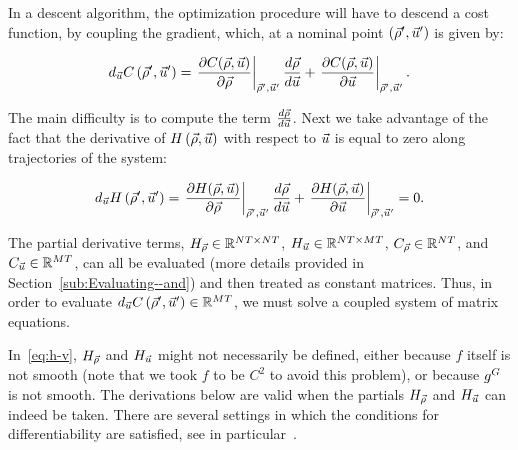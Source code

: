 In a descent algorithm, the optimization procedure will have to descend
a cost function, by coupling the gradient, which, at a nominal point
$\left(\vec{\rho}',\vec{u}'\right)$ is given by:

\begin{equation}
	d_{\vec{u}}C\left(\vec{\rho}',\vec{u}'\right)=\left.\frac{\partial C\text{\ensuremath{\left(\vec{\rho},\vec{u}\right)}}}{\partial\vec{\rho}}\right|_{\vec{\rho}',\vec{u}'}\frac{d\vec{\rho}}{d\vec{u}}+\left.\frac{\partial C\text{\ensuremath{\left(\vec{\rho},\vec{u}\right)}}}{\partial\vec{u}}\right|_{\vec{\rho}',\vec{u}'}\label{eq:j-v}.
\end{equation}


The main difficulty is to compute the term $\frac{d\vec{\rho}}{d\vec{u}}$.
Next we take advantage of the fact that the derivative of $H\left(\vec{\rho},\vec{u}\right)$
with respect to $\vec{u}$ is equal to zero along trajectories of
the system:

\begin{equation}
	d_{\vec{u}}H\left(\vec{\rho}',\vec{u}'\right)=\left.\frac{\partial H\text{\ensuremath{\left(\vec{\rho},\vec{u}\right)}}}{\partial\vec{\rho}}\right|_{\vec{\rho}',\vec{u}'}\frac{d\vec{\rho}}{d\vec{u}}+\left.\frac{\partial H\text{\ensuremath{\left(\vec{\rho},\vec{u}\right)}}}{\partial\vec{u}}\right|_{\vec{\rho}',\vec{u}'}=0\label{eq:h-v}.
\end{equation}


The partial derivative terms, $H_{\vec{\rho}}\in\mathbb{R}^{NT\times NT}$,
$H_{\vec{u}}\in\mathbb{R}^{NT\times MT}$, $C_{\vec{\rho}}\in\mathbb{R}^{NT}$,
and $C_{\vec{u}}\in\mathbb{R}^{MT}$, can all be evaluated (more
details provided in Section~\ref{sub:Evaluating--and}) and then
treated as constant matrices. Thus, in order to evaluate $d_{\vec{u}}C\left(\vec{\rho}',\vec{u}'\right)\in\mathbb{R}^{MT}$,
we must solve a coupled system of matrix equations.
\begin{note}
	In~\eqref{eq:h-v}, $H_{\vec{\rho}}$ and $H_{\vec{u}}$ might not necessarily be defined,
	either because $f$ itself is not smooth (note that we took $f$ to
	be $C^{2}$ to avoid this problem), or because $g^{G}$ is not
	smooth. The derivations below are valid when the partials $H_{\vec{\rho}}$ and
	$H_{\vec{u}}$ can indeed be taken. There are several settings in which the
	conditions for differentiability are satisfied, see in particular~\cite{Gugat2005,Flasskamp2012}.
\end{note}

